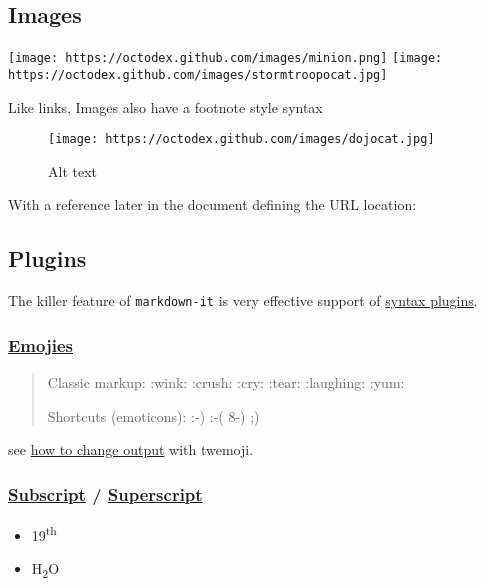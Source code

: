 \documentclass[]{article}
\providecommand{\tightlist}{%
  \setlength{\itemsep}{0pt}\setlength{\parskip}{0pt}}
\begin{document}
\subsection{Images}\label{images}

\texttt{[image: https://octodex.github.com/images/minion.png]}
\texttt{[image: https://octodex.github.com/images/stormtroopocat.jpg]}

Like links, Images also have a footnote style syntax

\begin{figure}[htbp]
\centering
\texttt{[image: https://octodex.github.com/images/dojocat.jpg]}
\caption{Alt text}
\end{figure}

With a reference later in the document defining the URL location:

\subsection{Plugins}\label{plugins}

The killer feature of \texttt{markdown-it} is very effective support of
\href{https://www.npmjs.org/browse/keyword/markdown-it-plugin}{syntax
plugins}.

\subsubsection{\texorpdfstring{\href{https://github.com/markdown-it/markdown-it-emoji}{Emojies}}{Emojies}}\label{emojies}

\begin{quote}
Classic markup: :wink: :crush: :cry: :tear: :laughing: :yum:

Shortcuts (emoticons): :-) :-( 8-) ;)
\end{quote}

see
\href{https://github.com/markdown-it/markdown-it-emoji\#change-output}{how
to change output} with twemoji.

\subsubsection{\texorpdfstring{\href{https://github.com/markdown-it/markdown-it-sub}{Subscript}
/
\href{https://github.com/markdown-it/markdown-it-sup}{Superscript}}{Subscript / Superscript}}\label{subscript-superscript}

\begin{itemize}
\tightlist
\item
  19\textsuperscript{th}
\item
  H\textsubscript{2}O
\end{itemize}
\end{document}
